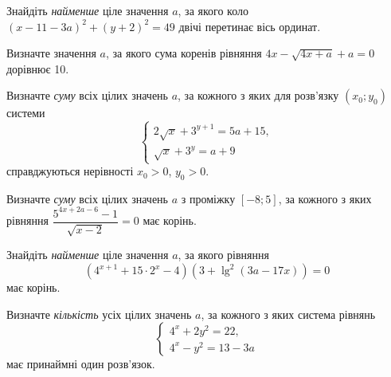 \documentclass[12pt]{article}
\begin{document}
\begin{samepage}
\noindent\zadnum Знайдіть \textit{найменше} ціле значення $a$, за якого коло $(x - 11 - 3a)^2 + (y + 2)^2 = 49$ двічі перетинає вісь ординат. 

\nmtnobreak
\nopagebreak\nbvspace{0.3cm}
\nmtAnswerBox
\par{}
\end{samepage}

\begin{samepage}
\noindent\zadnum Визначте значення $a$, за якого сума коренів рівняння $4x - \sqrt{4x + a} + a = 0$ дорівнює 10. 

\nmtnobreak
\nopagebreak\nbvspace{0.3cm}
\nmtAnswerBox
\par{}
\end{samepage}

\begin{samepage}
\noindent\zadnum Визначте \textit{суму} всіх цілих значень $a$, за кожного з яких для розв'язку $(x_0; y_0)$ системи
$$
\begin{cases}
2\sqrt{x} + 3^{y+1} = 5a + 15, \\
\sqrt{x} + 3^y = a + 9
\end{cases}
$$
справджуються нерівності $x_0 > 0$, $y_0 > 0$. 

\nmtnobreak
\nopagebreak\nbvspace{0.3cm}
\nmtAnswerBox
\par{}
\end{samepage}

\begin{samepage}
\noindent\zadnum Визначте \textit{суму} всіх цілих значень $a$ з проміжку $[-8; 5]$, за кожного з яких рівняння $\dfrac{5^{4x+2a-6} - 1}{\sqrt{x - 2}} = 0$ має корінь. 

\nmtnobreak
\nopagebreak\nbvspace{0.3cm}
\nmtAnswerBox
\par{}
\end{samepage}

\begin{samepage}
\noindent\zadnum Знайдіть \textit{найменше} ціле значення $a$, за якого рівняння
$$
(4^{x+1} + 15 \cdot 2^x - 4)(3 + \lg^2(3a - 17x)) = 0
$$
має корінь. 

\nmtnobreak
\nopagebreak\nbvspace{0.3cm}
\nmtAnswerBox
\par{}
\end{samepage}

\begin{samepage}
\noindent\zadnum Визначте \textit{кількість} усіх цілих значень $a$, за кожного з яких система рівнянь
$$
\begin{cases}
4^x + 2y^2 = 22, \\
4^x - y^2 = 13 - 3a
\end{cases}
$$
має принаймні один розв'язок. 

\nmtnobreak
\nopagebreak\nbvspace{0.3cm}
\nmtAnswerBox
\par{}
\end{samepage}
\end{document}
